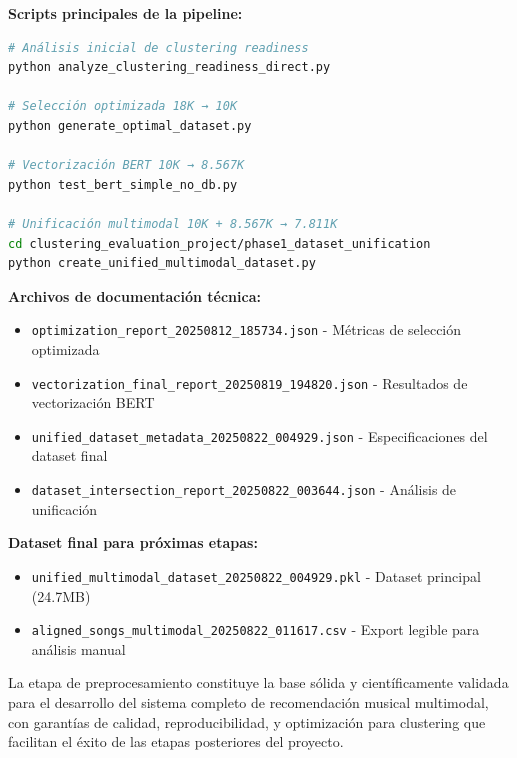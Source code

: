 \documentclass[12pt,a4paper]{article}
\begin{document}
\textbf{Scripts principales de la pipeline:}
\begin{lstlisting}[language=bash]
# Análisis inicial de clustering readiness
python analyze_clustering_readiness_direct.py

# Selección optimizada 18K → 10K
python generate_optimal_dataset.py

# Vectorización BERT 10K → 8.567K
python test_bert_simple_no_db.py

# Unificación multimodal 10K + 8.567K → 7.811K
cd clustering_evaluation_project/phase1_dataset_unification
python create_unified_multimodal_dataset.py
\end{lstlisting}

\textbf{Archivos de documentación técnica:}
\begin{itemize}[leftmargin=*]
    \item \texttt{optimization\_report\_20250812\_185734.json} - Métricas de selección optimizada
    \item \texttt{vectorization\_final\_report\_20250819\_194820.json} - Resultados de vectorización BERT
    \item \texttt{unified\_dataset\_metadata\_20250822\_004929.json} - Especificaciones del dataset final
    \item \texttt{dataset\_intersection\_report\_20250822\_003644.json} - Análisis de unificación
\end{itemize}

\textbf{Dataset final para próximas etapas:}
\begin{itemize}[leftmargin=*]
    \item \texttt{unified\_multimodal\_dataset\_20250822\_004929.pkl} - Dataset principal (24.7MB)
    \item \texttt{aligned\_songs\_multimodal\_20250822\_011617.csv} - Export legible para análisis manual
\end{itemize}

La etapa de preprocesamiento constituye la base sólida y científicamente validada para el desarrollo del sistema completo de recomendación musical multimodal, con garantías de calidad, reproducibilidad, y optimización para clustering que facilitan el éxito de las etapas posteriores del proyecto.
\end{document}
